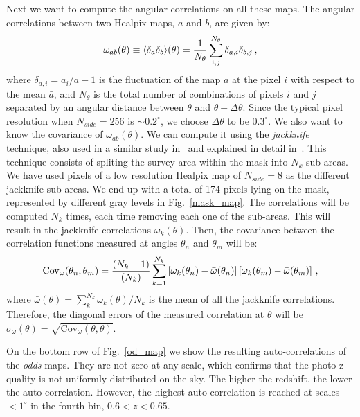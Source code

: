 Next we want to compute the angular correlations on all these maps. The angular correlations between two Healpix maps, $a$ and $b$, are given by:
\begin{equation}
\omega_{ab}(\theta) \equiv \langle \delta_a \delta_b \rangle (\theta) = {1 \over N_{\theta}} \sum^{N_{\theta}}_{i,j} \delta_{a,i} \delta_{b,j} \, ,
\label{measured_correlations}
\end{equation}
where $\delta_{a,i} = a_i/\bar{a} - 1$ is the fluctuation of the map $a$ at the pixel $i$ with respect to the mean $\bar{a}$, and $N_{\theta}$ is the total number of combinations of pixels $i$ and $j$ separated by an angular distance between $\theta$ and $\theta+\Delta \theta$. Since the typical pixel resolution  when $N_{side}=256$ is $\sim 0.2^\circ$, we choose $\Delta \theta$ to be $0.3^\circ$. We also want to know the covariance of $\omega_{ab}(\theta)$. We can compute it using the \textit{jackknife} technique, also used in a similar study in~\citet{Crocce2011} and explained in detail in~\citet{Cabre2007}. This technique consists of spliting the survey area within the mask into $N_k$ sub-areas. We have used pixels of a low resolution Healpix map of $N_{side}=8$ as the different jackknife sub-areas. We end up with a total of 174 pixels lying on the mask, represented by different gray levels in Fig.~\ref{mask_map}. The correlations will be computed $N_k$ times, each time removing each one of the sub-areas. This will result in the jackknife correlations $\omega_k(\theta)$. Then, the covariance between the correlation functions measured at angles $\theta_n$ and $\theta_m$ will be:
\begin{equation}
\text{Cov}_\omega(\theta_n, \theta_m) = {(N_k-1) \over (N_k)} \sum^{N_k}_{k=1}\left[ \omega_k(\theta_n) - \bar{\omega}(\theta_n) \right]\left[ \omega_k(\theta_m) - \bar{\omega}(\theta_m) \right] \, ,
\label{covariance}
\end{equation}
where $\bar{\omega}(\theta) = \sum_k^{N_k} \omega_k(\theta) / N_k$ is the mean of all the jackknife correlations. Therefore, the diagonal errors of the measured correlation at $\theta$ will be $\sigma_\omega (\theta) = \sqrt{\text{Cov}_\omega(\theta, \theta)}$.

On the bottom row of Fig.~\ref{od_map} we show the resulting auto-correlations of the \textit{odds} maps. They are not zero at any scale, which confirms that the photo-z quality is not uniformly distributed on the sky. The higher the redshift, the lower the auto correlation. However, the highest auto correlation is reached at scales $<1^\circ$ in the fourth bin, $0.6<z<0.65$. 

